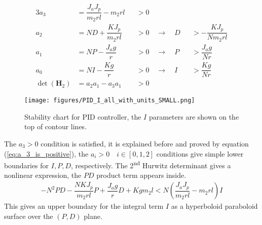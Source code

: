 \begin{alignat}{3}
	a_3&=\dfrac{J_a J_p}{m_2 r l}- m_2 r l &&>0 	\label{eq:PID_analog_a3}	
	\\
	a_2&=ND +\dfrac{KJ_p}{m_2 r l} &&>0 \quad \rightarrow \quad D &&> -\dfrac{KJ_p}{N m_2 r l} \\
	a_1&=NP - \dfrac{J_a g}{r} &&>0      \quad \rightarrow \quad P &&>	\dfrac{J_a g}{N r} \\
	a_0&=NI - \dfrac{Kg}{r} &&>0 	     \quad \rightarrow \quad I &&>	\dfrac{Kg}{N r}\\
	\det(\mathbf H_2) &= a_2a_1-a_3a_1 &&> 0
\end{alignat}

\begin{figure}[h]
	\centering
	\texttt{[image: figures/PID\_I\_all\_with\_units\_SMALL.png]}
	\caption{Stability chart for PID controller, the $I$ parameters are shown on the top of contour lines. }
	\label{fig:PID_I_200}
\end{figure}

\noindent
The $a_3>0$ condition is satisfied, it is explained before and proved by equation (\ref{eq:a_3_is_positive}), the $a_i > 0\quad i\in [0,1,2]$ conditions give simple lower boundaries for $I,P,D$, respectively. The 2\textsuperscript{nd} Hurwitz determinant gives a nonlinear expression, the $PD$ product term appears inside.
\begin{align}
	-N^2 P D - \dfrac{NKJ_p}{m_2 r l} P + \dfrac{J_a g}{r}D   + Kg m_2 l < N\left(\dfrac{J_a J_p}{m_2 r l}- m_2 r l\right)I
\end{align}
\noindent
This gives an upper boundary for the integral term $I$ as a hyperboloid paraboloid surface over the $(P,D)$ plane.










